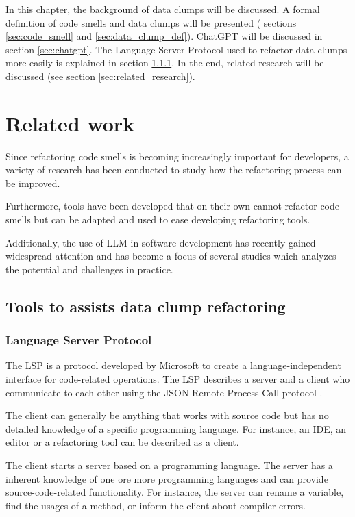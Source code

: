 In this chapter, the background of data clumps will be discussed. A formal definition of code smells and data clumps will be presented ( sections \ref{sec:code_smell} and \ref{sec:data_clump_def}). ChatGPT will be discussed in section \ref{sec:chatgpt}. The Language Server Protocol used to refactor data clumps more easily is explained in section \ref{sec:lsp}. In the end, related research will be discussed (see section \ref{sec:related_research}). 









\section{Related work}
Since refactoring code smells is becoming increasingly important for developers, a variety of research has been conducted to study how the refactoring process can be improved.

Furthermore, tools have been developed that on their own cannot refactor code smells but can be adapted and used to ease developing refactoring tools.

Additionally, the use of \ac{LLM} in software development has recently gained widespread attention and has become a focus of several studies which analyzes the potential and challenges in practice. 

\subsection{Tools to assists data clump refactoring}
\subsubsection{Language Server Protocol} \label{sec:lsp}
The \ac{LSP}  \cite{lsp_website} is a protocol developed by Microsoft to create a language-independent interface for code-related operations. 
The \ac{LSP}  describes a server and a client who communicate to each other using the JSON-Remote-Process-Call protocol \cite{json_rpc}. 

The client can generally be anything that works with source code but has no detailed knowledge of a specific programming language. For instance, an \ac{IDE}, an editor or a refactoring tool can be described as a client.

The client starts a server based on a programming language. The server has a inherent knowledge of one ore more programming languages and can provide source-code-related functionality. For instance, the server can rename a variable, find the usages of a method, or inform the client about compiler errors. 

